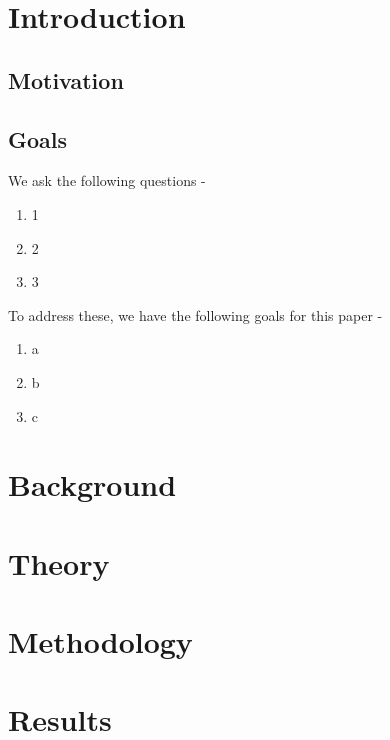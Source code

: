 \documentclass[11pt,a4paper]{article}
\begin{document}
\section{Introduction} \label{sec-intro}

\subsection{Motivation} \label{sec-motiv}

\subsection{Goals} \label{sec-goals}
We ask the following questions - 
\begin{enumerate}[topsep=0pt,itemsep=-0.75ex,partopsep=1ex,parsep=1ex,leftmargin=*,label=(\arabic*)]
    \item 1 
    \item 2
    \item 3
\end{enumerate}

To address these, we have the following goals for this paper - 
\begin{enumerate}[topsep=0pt,itemsep=-0.75ex,partopsep=1ex,parsep=1ex,leftmargin=*,label=(\arabic*)]
    \item a
    \item b
    \item c
\end{enumerate}


\newpage


\section{Background} \label{sec-bak}


\newpage


\section{Theory} \label{sec-theo}


\newpage


\section{Methodology} \label{sec-meth}


\newpage


\section{Results} \label{sec-res}
\end{document}
